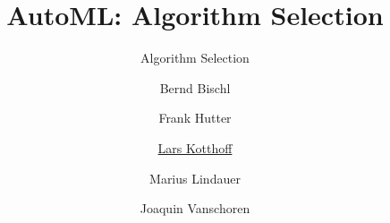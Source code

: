 



\title[AutoML: Overview]{AutoML: Algorithm Selection} %
\subtitle{Algorithm Selection} %
\author[Marius Lindauer]{Bernd Bischl \and Frank Hutter \and \underline{Lars Kotthoff}\newline \and Marius Lindauer \and Joaquin Vanschoren}
\institute{}
\date{}





	
	\maketitle
	

